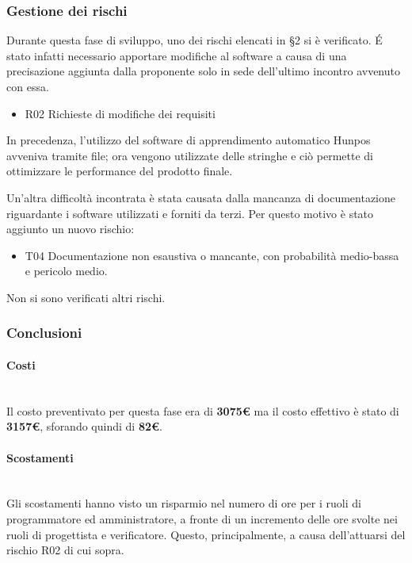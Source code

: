 	
\subsubsection{Gestione dei rischi}
Durante questa fase di sviluppo, uno dei rischi elencati in \S2 si è verificato. \'E stato infatti necessario apportare modifiche al software a causa di una precisazione aggiunta dalla proponente solo in sede dell'ultimo incontro avvenuto con essa. 
\begin{itemize}
	\item R02 Richieste di modifiche dei requisiti
\end{itemize}
In precedenza, l'utilizzo del software di apprendimento automatico Hunpos avveniva tramite file; ora vengono utilizzate delle stringhe e ciò permette di ottimizzare le performance del prodotto finale.

Un'altra difficoltà incontrata è stata causata dalla mancanza di documentazione riguardante i software utilizzati e forniti da terzi. Per questo motivo è stato aggiunto un nuovo rischio:
\begin{itemize}
	\item T04 Documentazione non esaustiva o mancante, con probabilità medio-bassa e pericolo medio. 
\end{itemize}

Non si sono verificati altri rischi. 
\subsubsection{Conclusioni}

\paragraph{Costi\\}\noindent\\
Il costo preventivato per questa fase era di \textbf{3075€} ma il costo effettivo è stato di \textbf{3157€}, sforando quindi di  \textbf{82€}. 
\paragraph{Scostamenti\\}\noindent \\
Gli scostamenti hanno visto un risparmio nel numero di ore per i ruoli di programmatore ed amministratore, a fronte di un incremento delle ore svolte nei ruoli di progettista e verificatore. Questo, principalmente, a causa dell'attuarsi del rischio R02 di cui sopra. 

